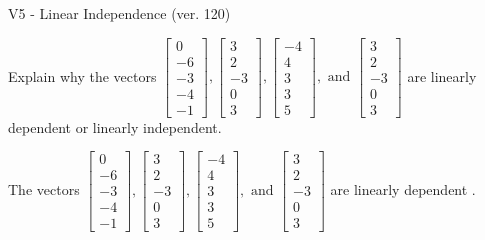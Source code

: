 \begin{exercise}
  \begin{exerciseTitle}V5 - Linear Independence (ver. 120)\end{exerciseTitle}
  \begin{exerciseStatement}
    Explain why the vectors \(\left[\begin{array}{r}
0 \\
-6 \\
-3 \\
-4 \\
-1
\end{array}\right] , \left[\begin{array}{r}
3 \\
2 \\
-3 \\
0 \\
3
\end{array}\right] , \left[\begin{array}{r}
-4 \\
4 \\
3 \\
3 \\
5
\end{array}\right] , \text{ and } \left[\begin{array}{r}
3 \\
2 \\
-3 \\
0 \\
3
\end{array}\right]\) are linearly dependent or linearly independent.	


  \end{exerciseStatement}
  \begin{exerciseAnswer}
   The vectors \(\left[\begin{array}{r}
0 \\
-6 \\
-3 \\
-4 \\
-1
\end{array}\right] , \left[\begin{array}{r}
3 \\
2 \\
-3 \\
0 \\
3
\end{array}\right] , \left[\begin{array}{r}
-4 \\
4 \\
3 \\
3 \\
5
\end{array}\right] , \text{ and } \left[\begin{array}{r}
3 \\
2 \\
-3 \\
0 \\
3
\end{array}\right]\) are 
  	 linearly dependent  .
  


  \end{exerciseAnswer}
\end{exercise}